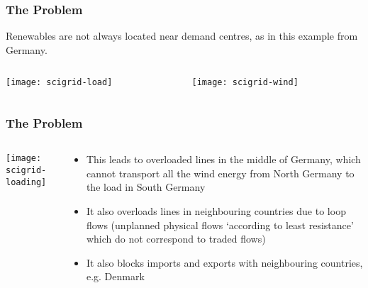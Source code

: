 \documentclass[10pt,aspectratio=169,dvipsnames]{beamer}
\let\olditem\item
\renewcommand{\item}{%
\olditem\vspace{5pt}}
\begin{document}
\begin{frame}
  \frametitle{The Problem}

  Renewables are not always located near demand centres, as in this example from Germany.



\begin{columns}[T]
  \begin{column}{6cm}
\texttt{[image: scigrid-load]}
  \end{column}

  \begin{column}{6cm}
  \texttt{[image: scigrid-wind]}


\end{column}
\end{columns}

\end{frame}


\begin{frame}
  \frametitle{The Problem}



\begin{columns}[T]
  \begin{column}{5cm}
\texttt{[image: scigrid-loading]}
  \end{column}

  \begin{column}{6cm}
    \begin{itemize}
      \item This leads to \alert{overloaded lines} in the middle of Germany, which
   cannot transport all the wind energy from North Germany to the load
   in South Germany

   \item It also overloads lines in neighbouring countries due to
     \alert{loop flows} (unplanned physical flows `according to least
     resistance' which do not correspond to traded flows)

     \item It also \alert{blocks imports and exports} with
       neighbouring countries, e.g. Denmark

    \end{itemize}

\end{column}
\end{columns}

\end{frame}
\end{document}
